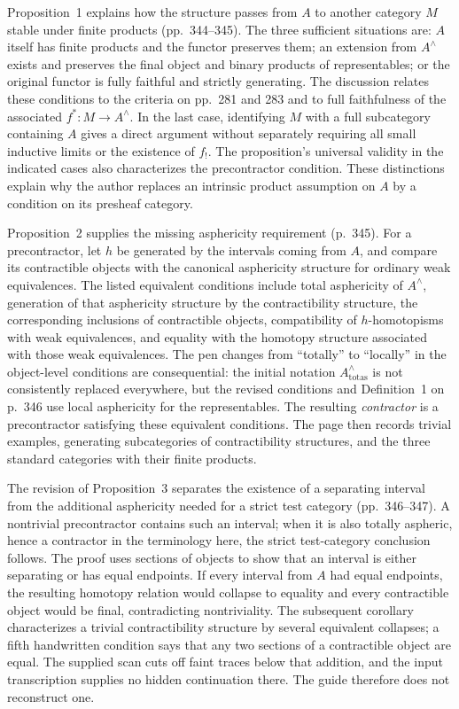Proposition~1 explains how the structure passes from $A$ to another category $M$ stable under finite products (pp.~344--345). The three sufficient situations are: $A$ itself has finite products and the functor preserves them; an extension from $A^{\wedge}$ exists and preserves the final object and binary products of representables; or the original functor is fully faithful and strictly generating. The discussion relates these conditions to the criteria on pp.~281 and 283 and to full faithfulness of the associated $f^*:M\to A^{\wedge}$. In the last case, identifying $M$ with a full subcategory containing $A$ gives a direct argument without separately requiring all small inductive limits or the existence of $f_!$. The proposition's universal validity in the indicated cases also characterizes the precontractor condition. These distinctions explain why the author replaces an intrinsic product assumption on $A$ by a condition on its presheaf category.

Proposition~2 supplies the missing asphericity requirement (p.~345). For a precontractor, let $h$ be generated by the intervals coming from $A$, and compare its contractible objects with the canonical asphericity structure for ordinary weak equivalences. The listed equivalent conditions include total asphericity of $A^{\wedge}$, generation of that asphericity structure by the contractibility structure, the corresponding inclusions of contractible objects, compatibility of $h$-homotopisms with weak equivalences, and equality with the homotopy structure associated with those weak equivalences. The pen changes from ``totally'' to ``locally'' in the object-level conditions are consequential: the initial notation $A^{\wedge}_{\mathrm{totas}}$ is not consistently replaced everywhere, but the revised conditions and Definition~1 on p.~346 use local asphericity for the representables. The resulting \emph{contractor} is a precontractor satisfying these equivalent conditions. The page then records trivial examples, generating subcategories of contractibility structures, and the three standard categories with their finite products.

The revision of Proposition~3 separates the existence of a separating interval from the additional asphericity needed for a strict test category (pp.~346--347). A nontrivial precontractor contains such an interval; when it is also totally aspheric, hence a contractor in the terminology here, the strict test-category conclusion follows. The proof uses sections of objects to show that an interval is either separating or has equal endpoints. If every interval from $A$ had equal endpoints, the resulting homotopy relation would collapse to equality and every contractible object would be final, contradicting nontriviality. The subsequent corollary characterizes a trivial contractibility structure by several equivalent collapses; a fifth handwritten condition says that any two sections of a contractible object are equal. The supplied scan cuts off faint traces below that addition, and the input transcription supplies no hidden continuation there. The guide therefore does not reconstruct one.

